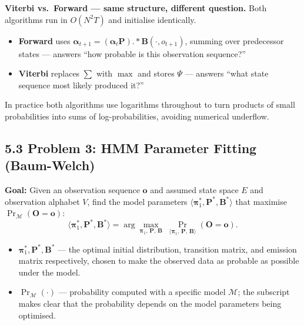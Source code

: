 \documentclass[12pt, a4paper]{article}
\begin{document}
\begin{keybox}
  \textbf{Viterbi vs.\ Forward --- same structure, different question.}
  Both algorithms run in $O(N^2 T)$ and initialise identically.
  \begin{itemize}[leftmargin=1.2em, itemsep=2pt]
    \item \textbf{Forward} uses $\boldsymbol{\alpha}_{t+1} = (\boldsymbol{\alpha}_t \mathbf{P})
      \mathbin{.*} \mathbf{B}(\cdot, o_{t+1})$, summing over predecessor states
      --- answers ``how probable is this observation sequence?''
    \item \textbf{Viterbi} replaces $\sum$ with $\max$ and stores
      $\Psi$ --- answers ``what state sequence most likely produced it?''
  \end{itemize}
  In practice both algorithms use logarithms throughout to turn products of
  small probabilities into sums of log-probabilities, avoiding numerical
  underflow.
\end{keybox}

\subsection*{5.3 \quad Problem 3: HMM Parameter Fitting (Baum-Welch)}

\textbf{Goal:} Given an observation sequence $\mathbf{o}$ and assumed state
space $E$ and observation alphabet $V$, find the model parameters
$\langle \boldsymbol{\pi}_1^*, \mathbf{P}^*, \mathbf{B}^* \rangle$ that
maximise $\Pr_{\mathcal{M}}(\mathbf{O}=\mathbf{o})$:
\[
  \langle \boldsymbol{\pi}_1^*, \mathbf{P}^*, \mathbf{B}^* \rangle
  = \arg\max_{\boldsymbol{\pi}_1,\,\mathbf{P},\,\mathbf{B}}\;
  \Pr_{\langle \boldsymbol{\pi}_1,\,\mathbf{P},\,\mathbf{B} \rangle}
  (\mathbf{O} = \mathbf{o}).
\]
\begin{itemize}[leftmargin=1.4em, itemsep=2pt]
  \item $\boldsymbol{\pi}_1^*, \mathbf{P}^*, \mathbf{B}^*$ --- the optimal
    initial distribution, transition matrix, and emission matrix respectively,
    chosen to make the observed data as probable as possible under the model.
  \item $\Pr_{\mathcal{M}}(\cdot)$ --- probability computed with a specific
    model $\mathcal{M}$; the subscript makes clear that the probability
    depends on the model parameters being optimised.
\end{itemize}
\end{document}
